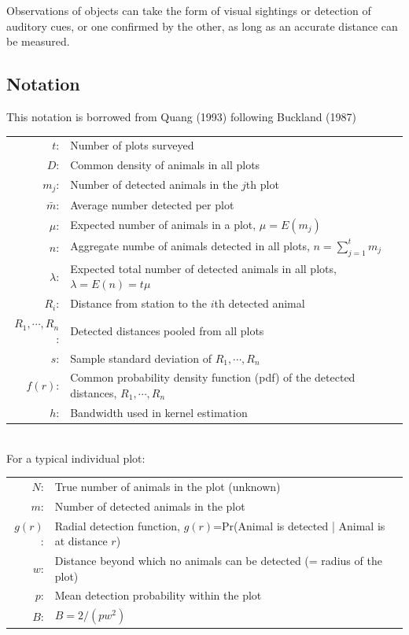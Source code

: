 \documentclass[12pt]{article}
\begin{document}
Observations of objects can take the form of visual sightings or detection of auditory cues, or one confirmed by the other, as long as an accurate distance can be measured.

\subsection{Notation}
This notation is borrowed from Quang (1993) following Buckland (1987)

\begin{tabular}{r l}
$t$:	&	Number of plots surveyed\\
$D$:	& Common density of animals in all plots\\
$m_j$:	& Number of detected animals in the $j$th plot\\
$\bar m$:	& Average number detected per plot\\
$\mu$:	& Expected number of animals in a plot, $\mu = E(m_j)$\\
$n$:	& Aggregate numbe of animals detected in all plots, $n=\sum_{j=1}^t m_j$\\
$\lambda$:	&	Expected total number of detected animals in all plots, $\lambda=E(n)=t\mu$\\
$R_i$:	& Distance from station to the $i$th detected animal\\
$R_1,\cdots,R_n$: & Detected distances pooled from all plots\\
$s$:	& Sample standard deviation of $R_1,\cdots,R_n$\\
$f(r)$: & Common probability density function (pdf) of the detected distances, $R_1,\cdots,R_n$\\
$h$: 	& Bandwidth used in kernel estimation
\end{tabular}\\

For a typical individual plot:

\begin{tabular}{r l}
$N$:	&	True number of animals in the plot (unknown)\\
$m$:	&	Number of detected animals in the plot\\
$g(r)$:	&	Radial detection function, $g(r)$=Pr(Animal is detected | Animal is at distance $r$)\\
$w$:	&	Distance beyond which no animals can be detected (= radius of the plot)\\
$p$:	& Mean detection probability within the plot\\
$B$:	&   $B = 2/(pw^2)$\\

\end{tabular}
\end{document}
